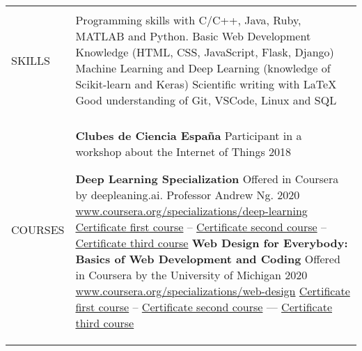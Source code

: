 \documentclass[letterpaper,10pt,oneside]{article}
\newcommand{\DatestampY}[1]{#1}
\newenvironment{body}
{\par\par
\begin{longtable}{p{0.125\textwidth}p{0.84\textwidth}}}
{\par\end{longtable}\par}
\renewcommand{\section}[3]{\\[-0.7cm]\pdfbookmark[2]{#2}{#3}\\%
\raggedleft  %
{\fontsize{9.5pt}{9.5pt}\selectfont\bfseries\raggedright%
\MakeUppercase{#1}}&}
\newcommand{\SmallEntryGap}{\par\vspace{0.38em}\par}
\begin{document}
\begin{body}


\section{Skills}{Skills}{PDF:Skills}
Programming skills with C/C++, Java, Ruby, MATLAB and Python. \newline
Basic Web Development Knowledge (HTML, CSS, JavaScript, Flask, Django) \newline
Machine Learning and Deep Learning (knowledge of Scikit-learn and Keras) \newline
Scientific writing with {\LaTeX} \newline
Good understanding of Git, VSCode, Linux and SQL

\SmallEntryGap

\section{Courses}{Courses}{PDF:Courses}

\textbf{Clubes de Ciencia España} Participant in a workshop about the Internet of Things \hfill \DatestampY{2018}

\textbf{Deep Learning Specialization} Offered in Coursera by deepleaning.ai. Professor Andrew Ng. \hfill \DatestampY{2020} \newline
\href{https://www.coursera.org/specializations/deep-learning} {www.coursera.org/specializations/deep-learning} \newline \href{https://coursera.org/share/c36b607d339491c57250604518bbe799} {Certificate first course}  --
\href{https://coursera.org/share/fe222b7353cb094de6b22e1e3e643737} {Certificate second course}  --
\href{https://coursera.org/share/bd68f12f63ad303dbe4bc8e1736a4d2d} {Certificate third course} \newline
\textbf{Web Design for Everybody: Basics of Web Development and Coding} \newline
Offered in Coursera by the University of Michigan \hfill \DatestampY{2020} \newline
\href{https://www.coursera.org/specializations/web-design} {www.coursera.org/specializations/web-design}\newline
\href{https://coursera.org/share/e682bbf75a355fd21f8a3628cc47abd0}{Certificate first course} -- 
\href{https://coursera.org/share/82d2da7ee39461481f5b9dd020cffe15}{Certificate second course} ---
\href{https://coursera.org/share/38182e43ec72e328895d0d5df3d01b54}{Certificate third course}	\newline
\SmallEntryGap

\end{body}
\end{document}
